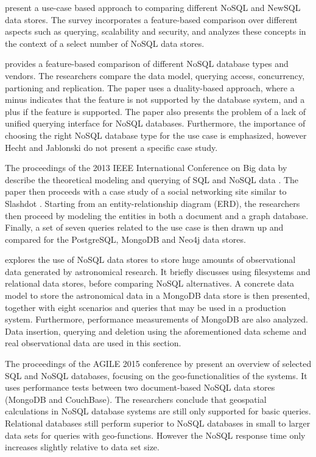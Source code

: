 \textcite{Grolinger2013} present a use-case based approach to comparing different NoSQL and NewSQL data stores.
The survey incorporates a feature-based comparison over different aspects such as querying, scalability and security, and analyzes these concepts in the context of a select number of NoSQL data stores.

\textcite{Hecht2011} provides a feature-based comparison of different NoSQL database types and vendors.
The researchers compare the data model, querying access, concurrency, partioning and replication.
The paper uses a duality-based approach, where a minus indicates that the feature is not supported by the database system, and a plus if the feature is supported.
The paper also presents the problem of a lack of unified querying interface for NoSQL databases.
Furthermore, the importance of choosing the right NoSQL database type for the use case is emphasized, however Hecht and Jablonski do not present a specific case study.

The proceedings of the 2013 IEEE International Conference on Big data by \textcite{Kaur2013} describe the theoretical modeling and querying of SQL and NoSQL data
\stores.
The paper then proceeds with a case study of a social networking site similar to Slashdot \autocite{Malda1997}.
Starting from an entity-relationship diagram (ERD), the researchers then proceed by modeling the entities in both a document and a graph database.
Finally, a set of seven queries related to the use case is then drawn up and compared for the PostgreSQL, MongoDB and Neo4j data stores.

\textcite{Zhao2015} explores the use of NoSQL data stores to store huge amounts of observational data generated by astronomical research.
It briefly discusses using filesystems and relational data stores, before comparing NoSQL alternatives.
A concrete data model to store the astronomical data in a MongoDB data store is then presented, together with eight scenarios and queries that may be used in a production system.
Furthermore, performance measurements of MongoDB are also analyzed.
Data insertion, querying and deletion using the aforementioned data scheme and real observational data are used in this section.

The proceedings of the AGILE 2015 conference by \textcite{Schmid2015} present an overview of selected SQL and NoSQL databases, focusing on the geo-functionalities of the systems.
It uses performance tests between two document-based NoSQL data stores (MongoDB and CouchBase).
The researchers conclude that geospatial calculations in NoSQL database systems are still only supported for basic queries.
Relational databases still perform superior to NoSQL databases in small to larger data sets for queries with geo-functions.
However the NoSQL response time only increases slightly relative to data set size.

